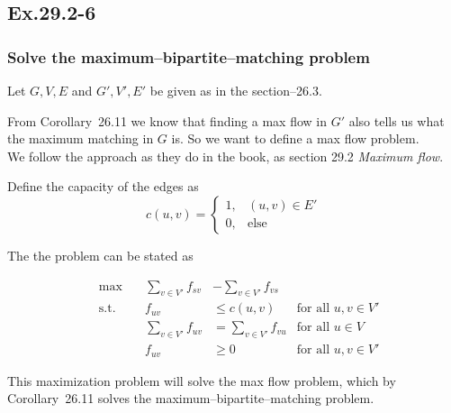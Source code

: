 \subsection*{Ex.29.2-6}
\subsubsection{Solve the maximum--bipartite--matching problem}

Let $G, V, E$ and $G', V', E'$ be given as in the section--26.3.

From Corollary~26.11 we know that finding a max flow in $G'$ also tells us what the maximum matching in $G$ is. So we want to define a max flow problem.
\\
We follow the approach as they do in the book, as section 29.2 \emph{Maximum flow}.

Define the capacity of the edges as
$$
c(u,v) = 
\begin{cases}
1, & (u,v)\in E'\\
0, & \text{else}
\end{cases}
$$

The the problem can be stated as

\begin{align*}
&\max      \quad  &\sum_{v\in V'}f_{sv}  &- \sum_{v\in V'}f_{vs}   &\\
&\text{s.t.}      & f_{uv}               &\leq c(u,v)              &\text{for all } u,v \in V'\\
&                 & \sum_{v\in V'}f_{uv} &= \sum_{v\in V'}f_{vu}   &\text{for all } u \in V\\
&                 & f_{uv}               &\geq 0                   &\text{for all } u,v \in V'
\end{align*}

This maximization problem will solve the max flow problem, which by Corollary~26.11 solves the maximum--bipartite--matching problem.